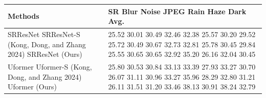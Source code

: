 \begin{tabular}{ll}
\toprule
Methods & SR Blur Noise JPEG Rain Haze Dark Avg. \\
\midrule
SRResNet SRResNet-S (Kong, Dong, and Zhang 2024) SRResNet (Ours) & 25.52 30.01 30.49 32.46 32.38 25.57 30.20 29.52 25.72 30.49 30.67 32.73 32.81 25.78 30.45 29.84 25.55 30.65 30.65 32.92 35.20 26.16 32.04 30.45 \\
Uformer Uformer-S (Kong, Dong, and Zhang 2024) Uformer (Ours) & 25.80 30.53 30.84 33.13 33.39 27.93 33.27 30.70 26.07 31.11 30.96 33.27 35.96 28.29 32.80 31.21 26.11 31.51 31.20 33.46 38.13 30.91 38.24 32.79 \\
\bottomrule
\end{tabular}
